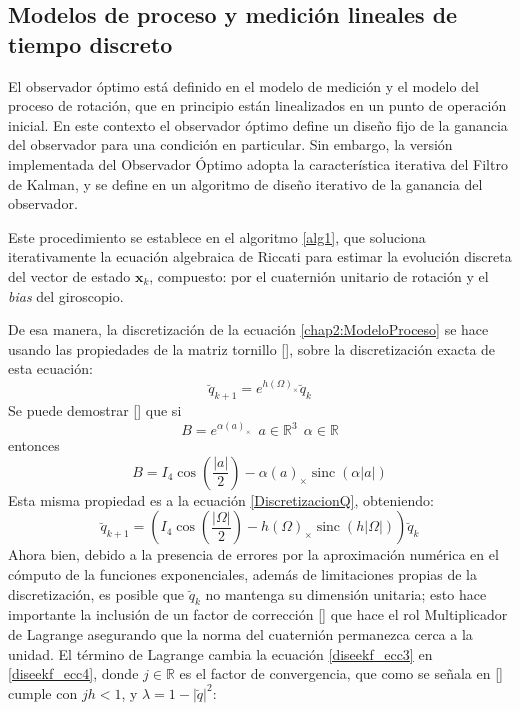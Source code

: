 \documentclass[10pt]{report}
\numberwithin{equation}{chapter}
\numberwithin{algorithm}{chapter}
\DeclareMathOperator{\sinc}{sinc}
\newcommand{\vect}[1]{\boldsymbol{#1}}
\newcommand{\bias}{\emph{bias} }
\begin{document}
\subsection{Modelos de proceso y medición lineales de tiempo discreto}
El observador óptimo está definido en el modelo de medición y el modelo del proceso de rotación, que en principio están linealizados en un punto de operación inicial. En este contexto el observador óptimo define un diseño fijo de la ganancia del observador para una condición en particular. Sin embargo, la versión implementada del Observador Óptimo adopta la característica iterativa del Filtro de Kalman, y se define en un algoritmo de diseño iterativo de la ganancia del observador.\par
Este procedimiento se establece en el algoritmo \ref{alg1}, que soluciona iterativamente la ecuación algebraica de Riccati para estimar la evolución discreta del vector de estado $\vect{x}_k$, compuesto: por el cuaternión unitario de rotación y el \bias del giroscopio.\par
De esa manera, la discretización de la ecuación \eqref{chap2:ModeloProceso} se hace usando las propiedades de la matriz tornillo [\cite{Stevens2003}], sobre la discretización exacta de esta ecuación: \begin{equation}\label{DiscretizacionQ}
\breve{q}_{k+1}=e^{h(\Omega)_\times}\breve{q}_k
\end{equation}
Se puede demostrar [\cite{Merwe2004}] que si $$B=e^{\alpha (a)_\times}~~a\in\mathbb{R}^3~~\alpha\in\mathbb{R}$$ entonces $$B=I_4\cos(\frac{|a|}{2})-\alpha (a)_\times\sinc (\alpha |a|)$$ Esta misma propiedad es a la ecuación \ref{DiscretizacionQ}, obteniendo: \begin{equation}\label{diseekf_ecc3}
\breve{q}_{k+1}=\left(I_4\cos(\frac{|\Omega|}{2})-h (\Omega)_\times\sinc (h |\Omega|)\right)\breve{q}_k
\end{equation}
Ahora bien, debido a la presencia de errores por la aproximación numérica en el cómputo de la funciones exponenciales, además de limitaciones propias de la discretización, es posible que $\breve{q}_k$ no mantenga su dimensión unitaria; esto hace importante la inclusión de un factor de corrección [\cite{Rolfe1988}] que hace el rol Multiplicador de Lagrange asegurando que la norma del cuaternión permanezca cerca a la unidad. El término de Lagrange cambia la ecuación \eqref{diseekf_ecc3} en \eqref{diseekf_ecc4}, donde $j\in\mathbb{R}$ es el factor de convergencia, que como se señala en [\cite{Gavrilets2003}] cumple con $jh<1$, y $\lambda=1-|\breve{q}|^2$:
\end{document}
